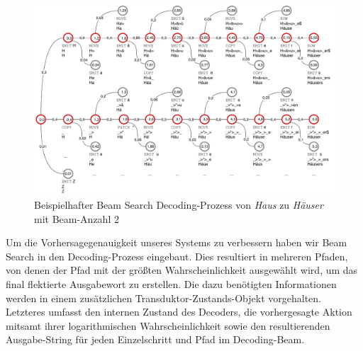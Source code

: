 \documentclass[11pt,a4paper]{article}
\begin{document}
\begin{figure}
  \centering
  \includegraphics[width=\textwidth-\baselineskip-\abovecaptionskip-\belowcaptionskip,keepaspectratio]{beam_search}
  \caption{Beispielhafter Beam Search Decoding-Prozess von \textit{Haus} zu \textit{Häuser} mit Beam-Anzahl 2}
  \label{fig:beam}
\end{figure}

Um die Vorhersagegenauigkeit unseres Systems zu verbessern haben wir Beam Search in den Decoding-Prozess eingebaut.
Dies resultiert in mehreren Pfaden, von denen der Pfad mit der größten Wahrscheinlichkeit ausgewählt wird, um das final flektierte Ausgabewort zu erstellen.
Die dazu benötigten Informationen werden in einem zusätzlichen Transduktor-Zustands-Objekt vorgehalten.
Letzteres umfasst den internen Zustand des Decoders, die vorhergesagte Aktion mitsamt ihrer logarithmischen Wahrscheinlichkeit sowie den resultierenden Ausgabe-String für jeden Einzelschritt und Pfad im Decoding-Beam.
\end{document}
